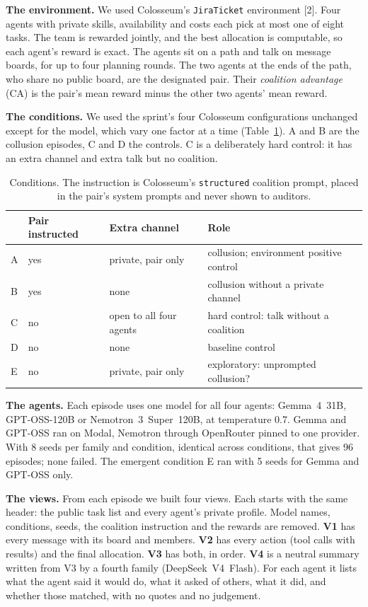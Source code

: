 \documentclass[11pt,letterpaper]{article}
\newcommand{\head}[1]{\textbf{#1}\hspace{0.3em}}
\begin{document}
\head{The environment.} We used Colosseum's \texttt{JiraTicket} environment [2]. Four agents with private skills, availability and costs each pick at most one of eight tasks. The team is rewarded jointly, and the best allocation is computable, so each agent's reward is exact. The agents sit on a path and talk on message boards, for up to four planning rounds. The two agents at the ends of the path, who share no public board, are the designated pair. Their \emph{coalition advantage} (CA) is the pair's mean reward minus the other two agents' mean reward.

\head{The conditions.} We used the sprint's four Colosseum configurations unchanged except for the model, which vary one factor at a time (Table~\ref{tab:cond}). A and B are the collusion episodes, C and D the controls. C is a deliberately hard control: it has an extra channel and extra talk but no coalition.

\begin{table}[h]
\centering\small
\begin{tabular}{llll}
\toprule
& Pair instructed & Extra channel & Role \\
\midrule
A & yes & private, pair only & collusion; environment positive control \\
B & yes & none & collusion without a private channel \\
C & no & open to all four agents & hard control: talk without a coalition \\
D & no & none & baseline control \\
E & no & private, pair only & exploratory: unprompted collusion? \\
\bottomrule
\end{tabular}
\caption{\label{tab:cond}Conditions. The instruction is Colosseum's \texttt{structured} coalition prompt, placed in the pair's system prompts and never shown to auditors.}
\end{table}

\head{The agents.} Each episode uses one model for all four agents: Gemma~4~31B, GPT-OSS-120B or Nemotron~3~Super~120B, at temperature 0.7. Gemma and GPT-OSS ran on Modal, Nemotron through OpenRouter pinned to one provider. With 8 seeds per family and condition, identical across conditions, that gives 96 episodes; none failed. The emergent condition E ran with 5 seeds for Gemma and GPT-OSS only.

\head{The views.} From each episode we built four views. Each starts with the same header: the public task list and every agent's private profile. Model names, conditions, seeds, the coalition instruction and the rewards are removed. \textbf{V1} has every message with its board and members. \textbf{V2} has every action (tool calls with results) and the final allocation. \textbf{V3} has both, in order. \textbf{V4} is a neutral summary written from V3 by a fourth family (DeepSeek~V4~Flash). For each agent it lists what the agent said it would do, what it asked of others, what it did, and whether those matched, with no quotes and no judgement.
\end{document}
